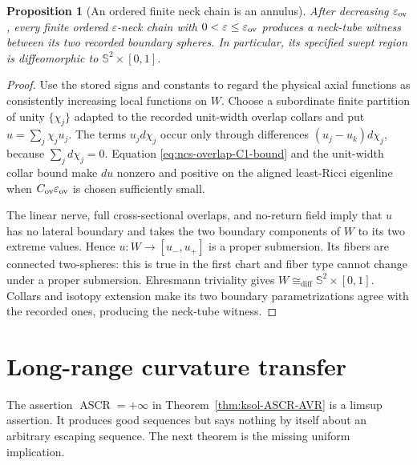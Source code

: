 \documentclass[10pt]{coll-l}
\newcommand{\Sph}{\mathbb{S}}
\newcommand{\diffeo}{\mathrel{\cong_{\mathrm{diff}}}}
\newtheorem{proposition}[theorem]{Proposition}
\theoremstyle{definition}
\theoremstyle{remark}
\numberwithin{section}{chapter}
\numberwithin{equation}{chapter}
\newcommand{\ASCR}{\operatorname{ASCR}}
\begin{document}
\begin{proposition}[An ordered finite neck chain is an annulus]
\label{prop:ncs-neck-chain-annulus}
After decreasing $\varepsilon_{\rm ov}$, every finite ordered
$\varepsilon$-neck chain with
$0<\varepsilon\leq\varepsilon_{\rm ov}$ produces a neck-tube witness
between its two recorded boundary spheres.  In particular, its specified
swept region is diffeomorphic to $\Sph^2\times[0,1]$.
\end{proposition}

\begin{proof}
Use the stored signs and constants to regard the physical axial functions
as consistently increasing local functions on $W$.  Choose a subordinate
finite partition of unity $\{\chi_j\}$ adapted to the recorded unit-width
overlap collars and put $u=\sum_j\chi_j u_j$.  The terms $u_jd\chi_j$
occur only through differences $(u_j-u_k)d\chi_j$, because
$\sum_jd\chi_j=0$.  Equation \eqref{eq:ncs-overlap-C1-bound} and the
unit-width collar bound make $du$ nonzero and positive on the aligned
least-Ricci eigenline when $C_{\rm ov}\varepsilon_{\rm ov}$ is chosen
sufficiently small.

The linear nerve, full cross-sectional overlaps, and no-return field imply
that $u$ has no lateral boundary and takes the two boundary components of
$W$ to its two extreme values.  Hence
$u:W\to[u_-,u_+]$ is a proper submersion.  Its fibers are connected
two-spheres: this is true in the first chart and fiber type cannot change
under a proper submersion.  Ehresmann triviality gives
$W\diffeo\Sph^2\times[0,1]$.  Collars and isotopy extension make its two
boundary parametrizations agree with the recorded ones, producing the
neck-tube witness.
\end{proof}

\section{Long-range curvature transfer}
\label{sec:ncs-long-range}

The assertion $\ASCR=+\infty$ in Theorem~\ref{thm:ksol-ASCR-AVR} is a
limsup assertion.  It produces good sequences but says nothing by itself
about an arbitrary escaping sequence.  The next theorem is the missing
uniform implication.
\end{document}
